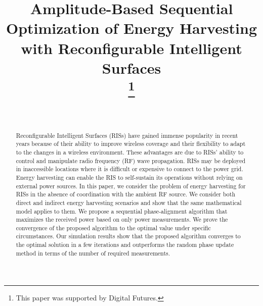 \documentclass[conference]{IEEEtran}
\begin{document}


\title{Amplitude-Based Sequential Optimization of Energy Harvesting with Reconfigurable Intelligent Surfaces\\
\thanks{This paper was supported by Digital Futures.}}


\author{\\\vspace{-2mm}
} 


\maketitle


\begin{abstract}
Reconfigurable Intelligent Surfaces (RISs) have gained immense popularity in recent years because of their ability to improve wireless coverage and their flexibility to adapt to the changes in a wireless environment. These advantages are due to RISs’ ability to control and manipulate radio frequency (RF) wave propagation. RISs may be deployed in inaccessible locations where it is difficult or expensive to connect to the power grid. Energy harvesting can enable the RIS to self-sustain its operations without relying on external power sources. In this paper, we consider the problem of energy harvesting for RISs in the absence of coordination with the ambient RF source. We consider both direct and indirect energy harvesting scenarios and show that the same mathematical model applies to them. We propose a sequential phase-alignment algorithm that maximizes the received power based on only power measurements. We prove the convergence of the proposed algorithm to the optimal value {\color{black} under specific circumstances}. Our simulation results show that the proposed algorithm converges to the optimal solution in a few iterations and outperforms the random phase update method in terms of the number of required measurements.
\end{abstract}
\end{document}
